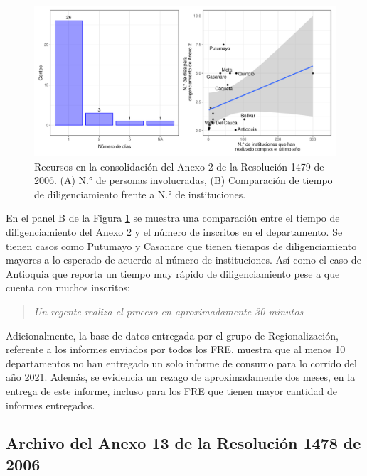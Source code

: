 \documentclass[
]{book}
\begin{document}
\begin{figure}[t!]

{\centering \includegraphics[width=1\linewidth]{InformeFinal_files/figure-latex/TiemposConsolidacionA2-1} 

}

\caption{Recursos en la consolidación del Anexo 2 de la Resolución 1479 de 2006. (A) N.° de personas involucradas, (B) Comparación de tiempo de diligenciamiento frente a N.° de instituciones.}\label{fig:TiemposConsolidacionA2}
\end{figure}

En el panel B de la Figura \ref{fig:TiemposConsolidacionA2} se muestra una comparación entre el tiempo de diligenciamiento del Anexo 2 y el número de inscritos en el departamento. Se tienen casos como Putumayo y Casanare que tienen tiempos de diligenciamiento mayores a lo esperado de acuerdo al número de instituciones. Así como el caso de Antioquia que reporta un tiempo muy rápido de diligenciamiento pese a que cuenta con muchos inscritos:

\begin{quote}
\emph{Un regente realiza el proceso en aproximadamente 30 minutos}
\end{quote}

Adicionalmente, la base de datos entregada por el grupo de Regionalización, referente a los informes enviados por todos los FRE, muestra que al menos 10 departamentos no han entregado un solo informe de consumo para lo corrido del año 2021. Además, se evidencia un rezago de aproximadamente dos meses, en la entrega de este informe, incluso para los FRE que tienen mayor cantidad de informes entregados.

\hypertarget{archivo-del-anexo-13-de-la-resoluciuxf3n-1478-de-2006}{%
\subsection{Archivo del Anexo 13 de la Resolución 1478 de 2006}\label{archivo-del-anexo-13-de-la-resoluciuxf3n-1478-de-2006}}
\end{document}
